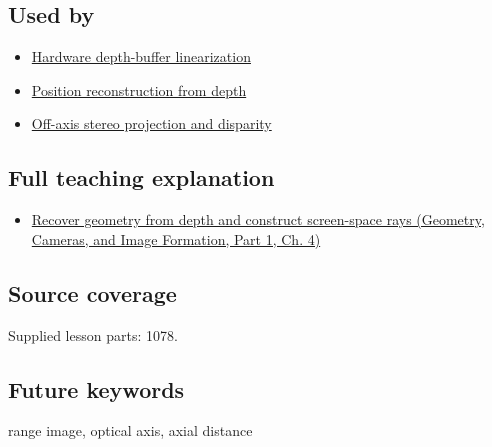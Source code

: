 \subsection{Used by}\label{appendix-cac01ebeeb11-used-by}

\hypertarget{appendix-cac01ebeeb11-used-by}{}

\begin{itemize}
\tightlist
\item
  \hyperref[appendix-1bc40b08db4a]{Hardware depth-buffer linearization}
\item
  \hyperref[appendix-2cbf2968e866]{Position reconstruction from depth}
\item
  \hyperref[appendix-0976e86e5b9f]{Off-axis stereo projection and disparity}
\end{itemize}

\subsection{Full teaching explanation}\label{appendix-cac01ebeeb11-full-teaching-explanation}

\hypertarget{appendix-cac01ebeeb11-full-teaching-explanation}{}

\begin{itemize}
\tightlist
\item
  \href{../03-Geometry-Cameras-and-Image-Formation-P01/main.pdf\#02-foundations-ii-ch035-recover-geometry-from-depth-and-construct-screen-space-rays}{Recover geometry from depth and construct screen-space rays (Geometry, Cameras, and Image Formation, Part 1, Ch. 4)}
\end{itemize}

\subsection{Source coverage}\label{appendix-cac01ebeeb11-source-coverage}

\hypertarget{appendix-cac01ebeeb11-source-coverage}{}

Supplied lesson parts: 1078.

\subsection{Future keywords}\label{appendix-cac01ebeeb11-future-keywords}

\hypertarget{appendix-cac01ebeeb11-future-keywords}{}

range image, optical axis, axial distance
